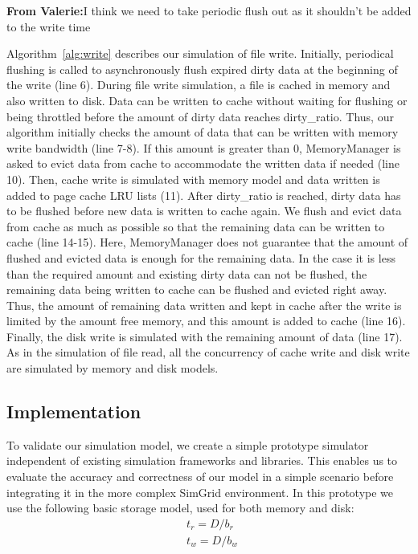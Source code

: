 \documentclass[conference]{IEEEtran}
\newcommand{\valerie}[1]{\color{blue}\textbf{From Valerie:}#1\color{black}}
\begin{document}
            \valerie{I think we need to take periodic flush out as it shouldn't be added to the write time}

			Algorithm~\ref{alg:write} describes our simulation of file write. 
			Initially, periodical flushing is called to asynchronously flush expired 
			dirty data at the beginning of the write (line 6).
			During file write simulation, a file is cached in memory and also written 
			to disk. Data can be written to cache without waiting for flushing or 
			being throttled before the amount of dirty data reaches dirty\_ratio. 
			Thus, our algorithm initially checks the amount of data that can be written 
			with memory write bandwidth (line 7-8).
			If this amount is greater than 0, MemoryManager is asked to evict 
			data from cache to accommodate the written data if needed (line 10). 
			Then, cache write is simulated with memory model and data written is 
			added to page cache LRU lists (11).
			After dirty\_ratio is reached, dirty data has to be flushed before new data 
			is written to cache again. 
			We flush and evict data from cache as much as possible so that the 
			remaining data can be written to cache (line 14-15). 
			Here, MemoryManager does not guarantee that the amount of flushed 
			and evicted data is enough for the remaining data. In the case it is 
			less than the required amount and existing dirty data can not be flushed, 
			the remaining data being written to cache can be flushed and evicted right away. 
			Thus, the amount of remaining data written and kept in cache 
			after the write is limited by the amount free memory, and this amount 
			is added to cache (line 16). 
			Finally, the disk write is simulated with the remaining amount of 
			data (line 17). As in the simulation of file read, all the concurrency  
			of cache write and disk write are simulated by memory and disk models.
			
		\subsection{Implementation}

			To validate our simulation model, we create a simple prototype
			simulator independent of existing simulation frameworks and libraries. 
			This enables us to evaluate the accuracy and correctness of our 
			model in a simple scenario before integrating it in the more complex SimGrid environment. 
			In this prototype we use the following basic storage model, used for both memory and disk: 
			\begin{align*}
				& t_{r} = D / b_r \\ 
				& t_{w} = D / b_w\
			\end{align*}		
			
\end{document}

